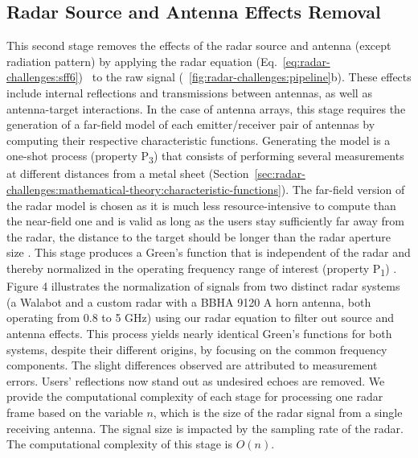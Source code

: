 \subsection{Radar Source and Antenna Effects Removal} \label{sec:radar-challenges:antenna-effects}
This second stage removes the effects of the radar source and antenna (except radiation pattern) by applying the radar equation (Eq.~\ref{eq:radar-challenges:sff6})~\cite{Lambot:2004,Lambot:2014} to the raw signal (\fig~\ref{fig:radar-challenges:pipeline}b). These effects include internal reflections and transmissions between antennas, as well as antenna-target interactions. In the case of antenna arrays, this stage requires the generation of a far-field model of each emitter/receiver pair of antennas by computing their respective characteristic functions. Generating the model is a one-shot process (property P\textsubscript{3}) that consists of performing several measurements at different distances from a metal sheet (Section~\ref{sec:radar-challenges:mathematical-theory:characteristic-functions}). The far-field version of the radar model is chosen as it is much less resource-intensive to compute than the near-field one and is valid as long as the users stay sufficiently far away from the radar, \ie the distance to the target should be longer than the radar aperture size \cite{Tran:2013}. This stage produces a Green's function that is independent of the radar and thereby normalized in the operating frequency range of interest (property P\textsubscript{1}) \cite{DeCoster:2018a}.  Figure 4 illustrates the normalization of signals from two distinct radar systems (a Walabot and a custom radar with a BBHA 9120 A horn antenna, both operating from 0.8 to 5 GHz) using our radar equation to filter out source and antenna effects. This process yields nearly identical Green's functions for both systems, despite their different origins, by focusing on the common frequency components. The slight differences observed are attributed to measurement errors. Users' reflections now stand out as undesired echoes are removed. 
% 
We provide the computational complexity of each stage for processing one radar frame based on the variable $n$, which is the size of the radar signal from a single receiving antenna. The signal size is impacted by the sampling rate of the radar. 
The computational complexity of this stage is $O(n)$.

